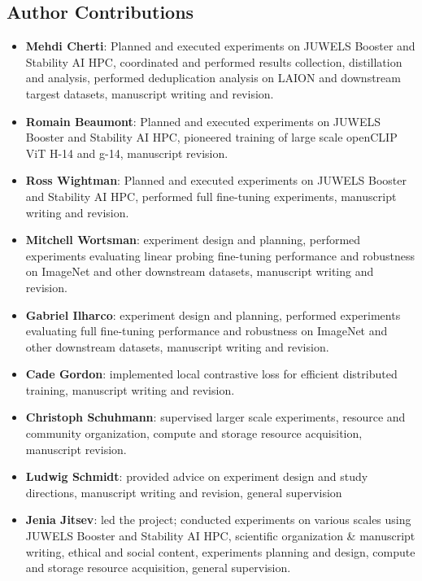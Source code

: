 \begin{appendix}
\section*{Author Contributions}
\begin{itemize}
\item \textbf{Mehdi Cherti}: Planned and executed experiments on JUWELS Booster and Stability AI HPC, coordinated and performed results collection, distillation and analysis, performed deduplication analysis on LAION and downstream targest datasets, manuscript writing and revision.
\item \textbf{Romain Beaumont}: Planned and executed experiments on JUWELS Booster and Stability AI HPC, pioneered training of large scale openCLIP ViT H-14 and g-14, manuscript revision.
\item \textbf{Ross Wightman}: Planned and executed experiments on JUWELS Booster and Stability AI HPC, performed full fine-tuning experiments, manuscript writing and revision.
\item \textbf{Mitchell Wortsman}: experiment design and planning, performed experiments evaluating linear probing fine-tuning performance and robustness on ImageNet and other downstream datasets, manuscript writing and revision.
\item \textbf{Gabriel Ilharco}: experiment design and planning, performed experiments evaluating full fine-tuning performance and robustness on ImageNet and other downstream datasets, manuscript writing and revision.
\item \textbf{Cade Gordon}: implemented local contrastive loss for efficient distributed training, manuscript writing and revision.
\item \textbf{Christoph Schuhmann}: supervised larger scale experiments, resource and community organization, compute and storage resource acquisition, manuscript revision.
\item \textbf{Ludwig Schmidt}: provided advice on experiment design and study directions, manuscript writing and revision, general supervision
\item \textbf{Jenia Jitsev}: led the project; conducted experiments on various scales using JUWELS Booster and Stability AI HPC, scientific organization \& manuscript writing, ethical and social content, experiments planning and design, compute and storage resource acquisition, general supervision.

\end{itemize}



\end{appendix}
